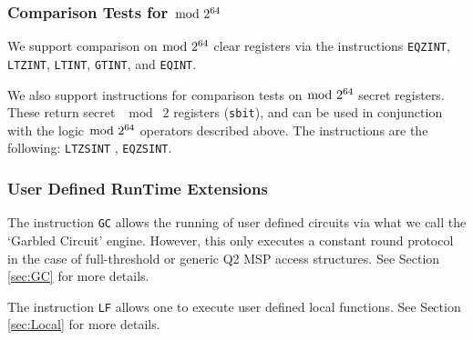 \subsubsection{Comparison Tests for $\bmod \; 2^{64}$}
We support comparison on $\bmod \; 2^{64}$ clear registers via the instructions
\verb+EQZINT+, \verb+LTZINT+, \verb+LTINT+, \verb+GTINT+, and \verb+EQINT+.

We also support instructions for comparison tests on $\bmod \; 2^{64}$ secret registers. These return
secret $\mod \; 2$ registers (\verb+sbit+), and can be used in conjunction with the logic $\bmod \; 2^{64}$ operators described above. The instructions are the following:
\verb+LTZSINT+ ,
\verb+EQZSINT+.

\subsubsection{User Defined RunTime Extensions}
The instruction \verb+GC+ allows the running of user defined
circuits via what we call the `Garbled Circuit' engine. However,
this only executes a constant round protocol in the case
of full-threshold or generic Q2 MSP access structures.
See Section \ref{sec:GC} for more details.

The instruction \verb|LF| allows one to execute user defined
local functions.
See Section \ref{sec:Local} for more details.


